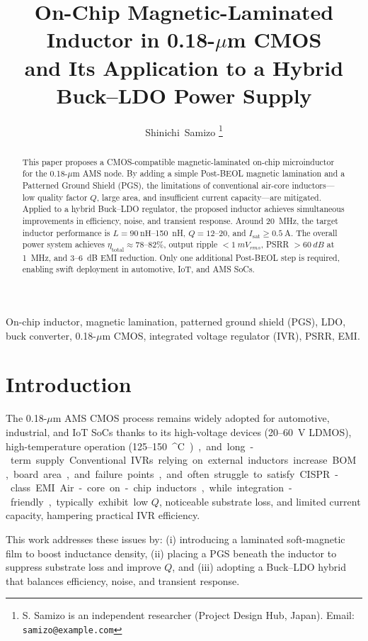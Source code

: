 \documentclass[journal]{IEEEtran}
\title{On-Chip Magnetic-Laminated Inductor in 0.18-\texorpdfstring{$\mu$}{µ}m CMOS\\
and Its Application to a Hybrid Buck--LDO Power Supply}
\author{Shinichi~Samizo%
\thanks{S. Samizo is an independent researcher (Project Design Hub, Japan).%
\newline Email: \texttt{samizo@example.com}}}
\begin{document}
\maketitle

\begin{abstract}
This paper proposes a CMOS-compatible magnetic-laminated on-chip microinductor for the 0.18-\mbox{$\mu$m} AMS node. By adding a simple Post-BEOL magnetic lamination and a Patterned Ground Shield (PGS), the limitations of conventional air-core inductors---low quality factor $Q$, large area, and insufficient current capacity---are mitigated. Applied to a hybrid Buck--LDO regulator, the proposed inductor achieves simultaneous improvements in efficiency, noise, and transient response. Around \SI{20}{\mega\hertz}, the target inductor performance is $L=\SI{90}{\nano\henry}$--\SI{150}{\nano\henry}, $Q=12$--20, and $I_\mathrm{sat}\ge\SI{0.5}{\ampere}$. The overall power system achieves $\eta_\mathrm{total}\approx78$--82\%, output ripple $<\SI{1}{mV_{rms}}$, PSRR $>\SI{60}{dB}$ at \SI{1}{\mega\hertz}, and \SI{3}{}--\SI{6}{dB} EMI reduction. Only one additional Post-BEOL step is required, enabling swift deployment in automotive, IoT, and AMS SoCs.
\end{abstract}

\begin{IEEEkeywords}
On-chip inductor, magnetic lamination, patterned ground shield (PGS), LDO, buck converter, 0.18-\mbox{$\mu$m} CMOS, integrated voltage regulator (IVR), PSRR, EMI.
\end{IEEEkeywords}

\section{Introduction}
The 0.18-\mbox{$\mu$m} AMS CMOS process remains widely adopted for automotive, industrial, and IoT SoCs thanks to its high-voltage devices (20--\SI{60}{V} LDMOS), high-temperature operation (\SI{125}{}--\SI{150}{^\circ C}), and long-term supply. Conventional IVRs relying on external inductors increase BOM, board area, and failure points, and often struggle to satisfy CISPR-class EMI. Air-core on-chip inductors, while integration-friendly, typically exhibit low $Q$, noticeable substrate loss, and limited current capacity, hampering practical IVR efficiency.

This work addresses these issues by: (i) introducing a laminated soft-magnetic film to boost inductance density, (ii) placing a PGS beneath the inductor to suppress substrate loss and improve $Q$, and (iii) adopting a Buck--LDO hybrid that balances efficiency, noise, and transient response.
\end{document}
